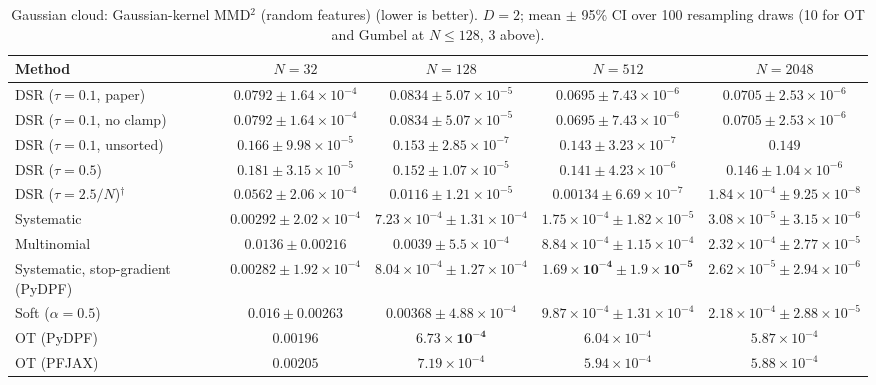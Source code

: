 \begin{table}[H]
\centering
\small
\caption{Gaussian cloud: Gaussian-kernel MMD$^2$ (random features) (lower is better). $D{=}2$; mean $\pm$ 95\% CI over 100 resampling draws (10 for OT and Gumbel at $N\le128$, 3 above).}
\label{tab:static-gaussian-rff_mmd2}
\begin{adjustbox}{max width=\linewidth}
\begin{tabular}{lcccc}
\toprule
Method & $N{=}32$ & $N{=}128$ & $N{=}512$ & $N{=}2048$ \\
\midrule
DSR ($\tau{=}0.1$, paper) & $0.0792\pm1.64\times10^{-4}$ & $0.0834\pm5.07\times10^{-5}$ & $0.0695\pm7.43\times10^{-6}$ & $0.0705\pm2.53\times10^{-6}$ \\
DSR ($\tau{=}0.1$, no clamp) & $0.0792\pm1.64\times10^{-4}$ & $0.0834\pm5.07\times10^{-5}$ & $0.0695\pm7.43\times10^{-6}$ & $0.0705\pm2.53\times10^{-6}$ \\
DSR ($\tau{=}0.1$, unsorted) & $0.166\pm9.98\times10^{-5}$ & $0.153\pm2.85\times10^{-7}$ & $0.143\pm3.23\times10^{-7}$ & $0.149$ \\
DSR ($\tau{=}0.5$) & $0.181\pm3.15\times10^{-5}$ & $0.152\pm1.07\times10^{-5}$ & $0.141\pm4.23\times10^{-6}$ & $0.146\pm1.04\times10^{-6}$ \\
DSR ($\tau{=}2.5/N$)$^\dagger$ & $0.0562\pm2.06\times10^{-4}$ & $0.0116\pm1.21\times10^{-5}$ & $0.00134\pm6.69\times10^{-7}$ & $1.84\times10^{-4}\pm9.25\times10^{-8}$ \\
\midrule
Systematic & $0.00292\pm2.02\times10^{-4}$ & $7.23\times10^{-4}\pm1.31\times10^{-4}$ & $1.75\times10^{-4}\pm1.82\times10^{-5}$ & $3.08\times10^{-5}\pm3.15\times10^{-6}$ \\
Multinomial & $0.0136\pm0.00216$ & $0.0039\pm5.5\times10^{-4}$ & $8.84\times10^{-4}\pm1.15\times10^{-4}$ & $2.32\times10^{-4}\pm2.77\times10^{-5}$ \\
Systematic, stop-gradient (PyDPF) & $0.00282\pm1.92\times10^{-4}$ & $8.04\times10^{-4}\pm1.27\times10^{-4}$ & $\mathbf{1.69\times10^{-4}\pm1.9\times10^{-5}}$ & $2.62\times10^{-5}\pm2.94\times10^{-6}$ \\
Soft ($\alpha{=}0.5$) & $0.016\pm0.00263$ & $0.00368\pm4.88\times10^{-4}$ & $9.87\times10^{-4}\pm1.31\times10^{-4}$ & $2.18\times10^{-4}\pm2.88\times10^{-5}$ \\
OT (PyDPF) & $\mathbf{0.00196}$ & $\mathbf{6.73\times10^{-4}}$ & $6.04\times10^{-4}$ & $5.87\times10^{-4}$ \\
OT (PFJAX) & $0.00205$ & $7.19\times10^{-4}$ & $5.94\times10^{-4}$ & $5.88\times10^{-4}$ \\

\end{tabular}
\end{adjustbox}
\end{table}
